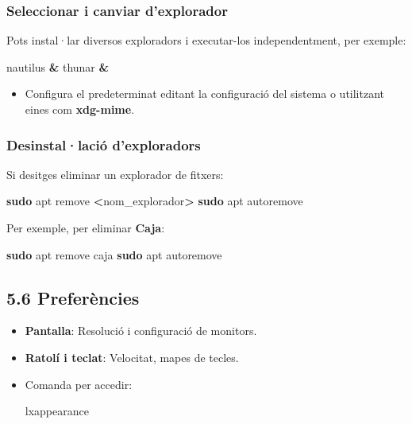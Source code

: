 \documentclass[
  a4paper,
]{article}
\newenvironment{Shaded}{\begin{snugshade}}{\end{snugshade}}
\newcommand{\ExtensionTok}[1]{#1}
\newcommand{\FunctionTok}[1]{\textcolor[rgb]{0.13,0.29,0.53}{\textbf{#1}}}
\newcommand{\KeywordTok}[1]{\textcolor[rgb]{0.13,0.29,0.53}{\textbf{#1}}}
\newcommand{\NormalTok}[1]{#1}
\newcommand{\OperatorTok}[1]{\textcolor[rgb]{0.81,0.36,0.00}{\textbf{#1}}}
\providecommand{\tightlist}{%
  \setlength{\itemsep}{0pt}\setlength{\parskip}{0pt}}
\begin{document}
\subsubsection{Seleccionar i canviar
d'explorador}\label{seleccionar-i-canviar-dexplorador}

Pots instal·lar diversos exploradors i executar-los independentment, per
exemple:

\begin{Shaded}
\begin{Highlighting}[]
\ExtensionTok{nautilus} \KeywordTok{\&}
\ExtensionTok{thunar} \KeywordTok{\&}
\end{Highlighting}
\end{Shaded}

\begin{itemize}
\tightlist
\item
  Configura el predeterminat editant la configuració del sistema o
  utilitzant eines com \textbf{xdg-mime}.
\end{itemize}

\subsubsection{Desinstal·lació
d'exploradors}\label{desinstallaciuxf3-dexploradors}

Si desitges eliminar un explorador de fitxers:

\begin{Shaded}
\begin{Highlighting}[]
\FunctionTok{sudo}\NormalTok{ apt remove }\OperatorTok{\textless{}}\NormalTok{nom\_explorador}\OperatorTok{\textgreater{}}
\FunctionTok{sudo}\NormalTok{ apt autoremove}
\end{Highlighting}
\end{Shaded}

Per exemple, per eliminar \textbf{Caja}:

\begin{Shaded}
\begin{Highlighting}[]
\FunctionTok{sudo}\NormalTok{ apt remove caja}
\FunctionTok{sudo}\NormalTok{ apt autoremove}
\end{Highlighting}
\end{Shaded}

\subsection{5.6 Preferències}\label{preferuxe8ncies}

\begin{itemize}
\item
  \textbf{Pantalla}: Resolució i configuració de monitors.
\item
  \textbf{Ratolí i teclat}: Velocitat, mapes de tecles.
\item
  Comanda per accedir:

\begin{Shaded}
\begin{Highlighting}[]
\ExtensionTok{lxappearance}
\end{Highlighting}
\end{Shaded}
\end{itemize}
\end{document}
